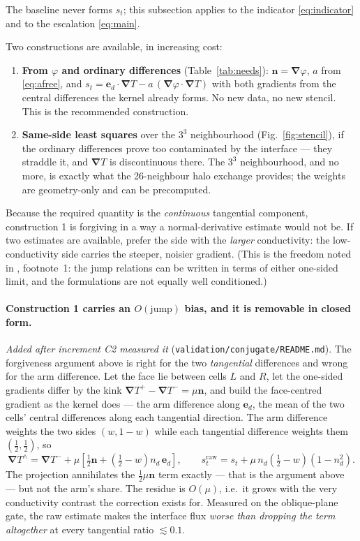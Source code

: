 \documentclass[11pt,a4paper]{article}
\newcommand{\ed}{\boldsymbol{e}_d}
\newcommand{\nn}{\boldsymbol{n}}
\newcommand{\grad}{\boldsymbol{\nabla}}
\newcommand{\code}[1]{\texttt{#1}}
\begin{document}
The baseline never forms $s_t$; this subsection applies to the indicator
\eqref{eq:indicator} and to the escalation \eqref{eq:main}.

Two constructions are available, in increasing cost:
\begin{enumerate}
\item \textbf{From $\varphi$ and ordinary differences} (Table~\ref{tab:needs}):
      $\nn=\grad\varphi$, $a$ from \eqref{eq:afree}, and
      $s_t=\ed\!\cdot\!\grad T-a\,(\grad\varphi\!\cdot\!\grad T)$ with both
      gradients from the central differences the kernel already forms. No new
      data, no new stencil. This is the recommended construction.
\item \textbf{Same-side least squares} over the $3^3$ neighbourhood
      (Fig.~\ref{fig:stencil}), if the ordinary differences prove too
      contaminated by the interface --- they straddle it, and $\grad T$ is
      discontinuous there. The $3^3$ neighbourhood, and no more, is exactly what
      the 26-neighbour halo exchange provides; the weights are geometry-only and
      can be precomputed.
\end{enumerate}
Because the required quantity is the \emph{continuous} tangential component,
construction 1 is forgiving in a way a normal-derivative estimate would not be.
If two estimates are available, prefer the side with the \emph{larger}
conductivity: the low-conductivity side carries the steeper, noisier gradient.
(This is the freedom noted in \cite{ejiim2000}, footnote~1: the jump relations
can be written in terms of either one-sided limit, and the formulations are not
equally well conditioned.)

\paragraph{Construction 1 carries an $O(\text{jump})$ bias, and it is
removable in closed form.}
\emph{Added after increment C2 measured it}
(\code{validation/conjugate/README.md}). The forgiveness argument above is
right for the two \emph{tangential} differences and wrong for the arm
difference. Let the face lie between cells $L$ and $R$, let the one-sided
gradients differ by the kink $\grad T^{+}-\grad T^{-}=\mu\nn$, and build the
face-centred gradient as the kernel does --- the arm difference along $\ed$,
the mean of the two cells' central differences along each tangential
direction. The arm difference weights the two sides $(w,1-w)$ while each
tangential difference weights them $(\tfrac12,\tfrac12)$, so
\begin{equation}
  \grad T^{\wedge} = \grad T^{-}
    + \mu\left[\tfrac12\nn + \left(\tfrac12-w\right)n_d\,\ed\right],
  \qquad
  s_t^{\text{raw}} = s_t + \mu\,n_d\left(\tfrac12-w\right)\left(1-n_d^{2}\right).
  \label{eq:stbias}
\end{equation}
The projection annihilates the $\tfrac12\mu\nn$ term exactly --- that is the
argument above --- but not the arm's share. The residue is $O(\mu)$, i.e.\ it
grows with the very conductivity contrast the correction exists for. Measured
on the oblique-plane gate, the raw estimate makes the interface flux
\emph{worse than dropping the term altogether} at every tangential ratio
$\lesssim0.1$.
\end{document}
